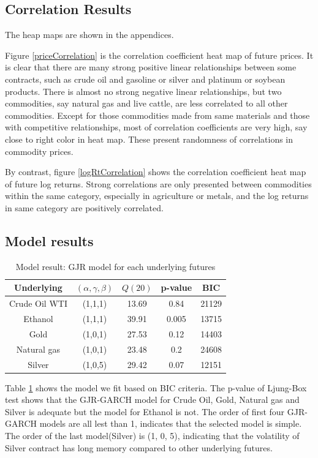 \documentclass[10pt, a4paper, twocolumn]{article} %
\begin{document}
\subsection{Correlation Results}

The heap maps are shown in the appendices.

Figure \ref{priceCorrelation} is the correlation coefficient heat map of future prices. It is clear that there are many strong positive linear relationships between some contracts, such as crude oil and gasoline or silver and platinum or soybean products. There is almost no strong negative linear relationships, but two commodities, say natural gas and live cattle, are less correlated to all other commodities. Except for those commodities made from same materials and those with competitive relationships, most of correlation coefficients are very high, say close to right color in heat map. These present randomness of correlations in commodity prices.

By contrast, figure \ref{logRtCorrelation} shows the correlation coefficient heat map of future log returns. Strong correlations are only presented between commodities within the same category, especially in agriculture or metals, and the log returns in same category are positively correlated.

\subsection{Model results}

\begin{table}[!ht]
\centering
\small
\begin{tabular}{ccccc}
\toprule
Underlying & $ (\alpha, \gamma, \beta) $ & $ Q(20) $ & p-value & BIC \\
\midrule
Crude Oil WTI & (1,1,1) & 13.69 & 0.84 & 21129 \\
Ethanol & (1,1,1) & 39.91 & 0.005 & 13715 \\
Gold & (1,0,1) & 27.53 & 0.12 & 14403  \\
Natural gas & (1,0,1) & 23.48 & 0.2 & 24608 \\
Silver & (1,0,5) & 29.42 & 0.07 & 12151 \\
\bottomrule
\end{tabular}
\caption{Model result: GJR model for each underlying futures}
\label{model result}
\end{table}

Table \ref{model result} shows the model we fit based on BIC criteria. The p-value of Ljung-Box test shows that the GJR-GARCH model for Crude Oil, Gold, Natural gas and Silver is adequate but the model for Ethanol is not. The order of first four GJR-GARCH models are all lest than 1, indicates that the selected model is simple. The order of the last model(Silver) is (1, 0, 5), indicating that the volatility of Silver contract has long memory compared to other underlying futures.
\end{document}
